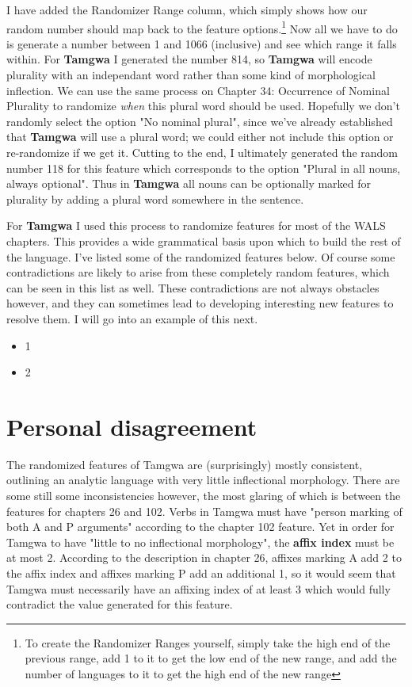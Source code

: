 \documentclass[a4paper,12pt,twoside,openright]{memoir}
\begin{document}
    I have added the Randomizer Range column, which simply shows how our random number should map back to the feature options.\footnote{To create the Randomizer Ranges yourself, simply take the high end of the previous range, add 1 to it to get the low end of the new range, and add the number of languages to it to get the high end of the new range}  Now all we have to do is generate a number between 1 and 1066 (inclusive) and see which range it falls within.  For \textbf{Tamgwa} I generated the number 814, so \textbf{Tamgwa} will encode plurality with an independant word rather than some kind of morphological inflection.  We can use the same process on Chapter 34: Occurrence of Nominal Plurality to randomize \textit{when} this plural word should be used.  Hopefully we don't randomly select the option "No nominal plural", since we've already established that \textbf{Tamgwa} will use a plural word; we could either not include this option or re-randomize if we get it.  Cutting to the end, I ultimately generated the random number 118 for this feature which corresponds to the option "Plural in all nouns, always optional".  Thus in \textbf{Tamgwa} all nouns can be optionally marked for plurality by adding a plural word somewhere in the sentence.

    For \textbf{Tamgwa} I used this process to randomize features for most of the WALS chapters.  This provides a wide grammatical basis upon which to build the rest of the language.  I've listed some of the randomized features below.  Of course some contradictions are likely to arise from these completely random features, which can be seen in this list as well.  These contradictions are not always obstacles however, and they can sometimes lead to developing interesting new features to resolve them.  I will go into an example of this next.

\begin{itemize}
    \item 1
    \item 2
\end{itemize}

\section*{Personal disagreement} %

    The randomized features of Tamgwa are (surprisingly) mostly consistent, outlining an analytic language with very little inflectional morphology.  There are some still some inconsistencies however, the most glaring of which is between the features for chapters 26 and 102.  Verbs in Tamgwa must have "person marking of both A and P arguments" according to the chapter 102 feature.  Yet in order for Tamgwa to have "little to no inflectional morphology", the \textbf{affix index} must be at most 2.  According to the description in chapter 26, affixes marking A add 2 to the affix index and affixes marking P add an additional 1, so it would seem that Tamgwa must necessarily have an affixing index of at least 3 which would fully contradict the value generated for this feature.
\end{document}
